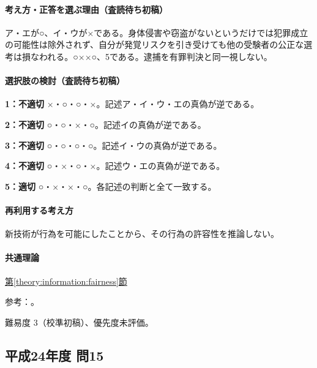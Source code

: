 \paragraph{考え方・正答を選ぶ理由（査読待ち初稿）} ア・エが○、イ・ウが×である。身体侵害や窃盗がないというだけでは犯罪成立の可能性は除外されず、自分が発覚リスクを引き受けても他の受験者の公正な選考は損なわれる。○××○、5である。逮捕を有罪判決と同一視しない。

\paragraph{選択肢の検討（査読待ち初稿）}\mbox{}\par

\noindent\textbf{1：不適切} ×・○・○・×。記述ア・イ・ウ・エの真偽が逆である。\par

\noindent\textbf{2：不適切} ○・○・×・○。記述イの真偽が逆である。\par

\noindent\textbf{3：不適切} ○・○・○・○。記述イ・ウの真偽が逆である。\par

\noindent\textbf{4：不適切} ○・×・○・×。記述ウ・エの真偽が逆である。\par

\noindent\textbf{5：適切} ○・×・×・○。各記述の判断と全て一致する。\par

\paragraph{再利用する考え方} 新技術が行為を可能にしたことから、その行為の許容性を推論しない。

\paragraph{共通理論} \hyperref[theory:information:fairness]{第\ref*{theory:information:fairness}節}

\par 参考：\cite{scj_code2006}。

\par 難易度 3（校準初稿）、優先度未評価。

\subsection{平成24年度 問15}
\label{q:h24-reg-apt-15}

